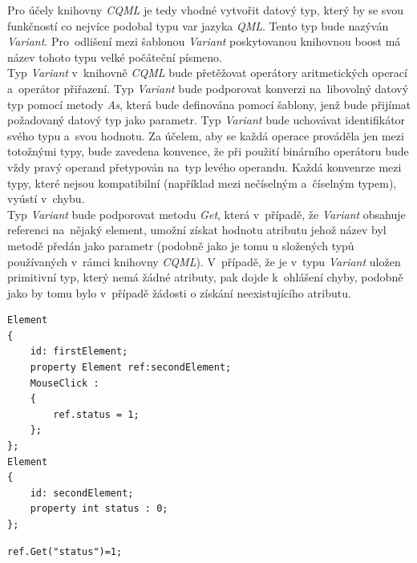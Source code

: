 \documentclass[11pt,twoside,a4paper]{book}
\begin{document}
Pro účely knihovny \textit{CQML} je tedy vhodné vytvořit datový typ, který by se svou funkčností co nejvíce podobal typu var jazyka \textit{QML}. Tento typ bude nazýván \textit{Variant}. Pro~odlišení mezi šablonou \textit{Variant} poskytovanou knihovnou boost má název tohoto typu velké počáteční písmeno.\\
Typ \textit{Variant} v~knihovně \textit{CQML} bude přetěžovat operátory aritmetických operací a~operátor přiřazení. Typ \textit{Variant} bude podporovat konverzi na~libovolný datový typ pomocí metody \textit{As}, která bude definována pomocí šablony, jenž bude přijímat požadovaný datový typ jako parametr. Typ \textit{Variant} bude uchovávat identifikátor svého typu a~svou hodnotu. Za účelem, aby se každá operace prováděla jen mezi totožnými typy, bude zavedena konvence, že při použití binárního operátoru bude vždy pravý operand přetypován na~typ levého operandu. Každá konvenrze mezi typy, které nejsou kompatibilní (například mezi nečíselným a~číselným typem), vyústí v~chybu.\\
Typ \textit{Variant} bude podporovat metodu \textit{Get}, která v~případě, že \textit{Variant} obsahuje referenci na~nějaký element, umožní získat hodnotu atributu jehož název byl metodě předán jako parametr (podobně jako je tomu u složených typů používaných v~rámci knihovny \textit{CQML}). V~případě, že je v~typu \textit{Variant} uložen primitivní typ, který nemá žádné atributy, pak dojde k~ohlášení chyby, podobně jako by tomu bylo v~případě žádosti o získání neexistujícího atributu.\\
\begin{lstlisting}[frame=single,caption=\textit{CQML} kód měnící hodnotu atributu elementu\, prostřednictvím reference na~daný element.,label=lst:var0N]
Element
{
	id: firstElement;
	property Element ref:secondElement;
	MouseClick :
	{
		ref.status = 1;
	};
};
Element
{
	id: secondElement;
	property int status : 0;
};
\end{lstlisting}
\begin{lstlisting}[frame=single,caption={Přeložený kód funkce, který ilustruje nutnost vrácení reference metodou \textit{Get}.},label=lst:var00N]
ref.Get("status")=1;
\end{lstlisting}
\end{document}
